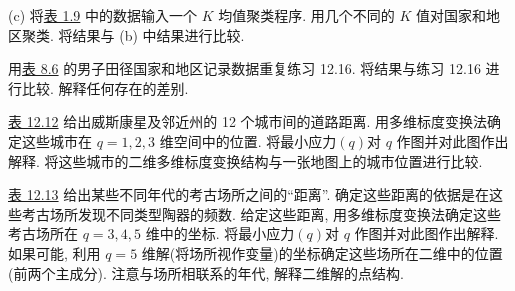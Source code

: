 \noindent (c) 将\hyperref[tab:1.9]{表 1.9} 中的数据输入一个 $K$ 均值聚类程序. 用几个不同的 $K$ 值对国家和地区聚类. 将结果与 (b) 中结果进行比较.

\quad 用\hyperref[tab:8.6]{表 8.6} 的男子田径国家和地区记录数据重复练习 12.16. 将结果与练习 12.16 进行比较. 解释任何存在的差别.

\quad \hyperref[tab:12.12]{表 12.12} 给出威斯康星及邻近州的 12 个城市间的道路距离. 用多维标度变换法确定这些城市在 $q=1,2,3$ 维空间中的位置. 将最小应力$(q)$对 $q$ 作图并对此图作出解释. 将这些城市的二维多维标度变换结构与一张地图上的城市位置进行比较.

\quad \hyperref[tab:12.13]{表 12.13} 给出某些不同年代的考古场所之间的“距离”. 确定这些距离的依据是在这些考古场所发现不同类型陶器的频数. 给定这些距离, 用多维标度变换法确定这些考古场所在 $q=3,4,5$ 维中的坐标. 将最小应力$(q)$对 $q$ 作图并对此图作出解释. 如果可能, 利用 $q=5$ 维解(将场所视作变量)的坐标确定这些场所在二维中的位置(前两个主成分). 注意与场所相联系的年代, 解释二维解的点结构.
